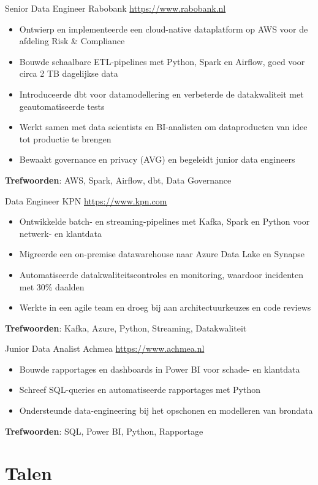 \documentclass[a4paper, serif, 10pt]{moderncv}
\begin{document}
        {Senior Data Engineer}
        {Rabobank}
        {\url{https://www.rabobank.nl}}
        {}
        {\begin{itemize}
\item Ontwierp en implementeerde een cloud-native dataplatform op AWS voor de afdeling Risk \& Compliance
\item Bouwde schaalbare ETL-pipelines met Python, Spark en Airflow, goed voor circa 2 TB dagelijkse data
\item Introduceerde dbt voor datamodellering en verbeterde de datakwaliteit met geautomatiseerde tests
\item Werkt samen met data scientists en BI-analisten om dataproducten van idee tot productie te brengen
\item Bewaakt governance en privacy (AVG) en begeleidt junior data engineers
\end{itemize}
\textbf{Trefwoorden}: AWS, Spark, Airflow, dbt, Data Governance}

        {Data Engineer}
        {KPN}
        {\url{https://www.kpn.com}}
        {}
        {\begin{itemize}
\item Ontwikkelde batch- en streaming-pipelines met Kafka, Spark en Python voor netwerk- en klantdata
\item Migreerde een on-premise datawarehouse naar Azure Data Lake en Synapse
\item Automatiseerde datakwaliteitscontroles en monitoring, waardoor incidenten met 30\% daalden
\item Werkte in een agile team en droeg bij aan architectuurkeuzes en code reviews
\end{itemize}
\textbf{Trefwoorden}: Kafka, Azure, Python, Streaming, Datakwaliteit}

        {Junior Data Analist}
        {Achmea}
        {\url{https://www.achmea.nl}}
        {}
        {\begin{itemize}
\item Bouwde rapportages en dashboards in Power BI voor schade- en klantdata
\item Schreef SQL-queries en automatiseerde rapportages met Python
\item Ondersteunde data-engineering bij het opschonen en modelleren van brondata
\end{itemize}
\textbf{Trefwoorden}: SQL, Power BI, Python, Rapportage}
\section{Talen}
\end{document}
